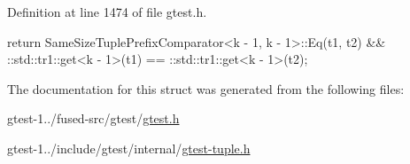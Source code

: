 \-Definition at line 1474 of file gtest.\-h.


\begin{DoxyCode}
                                                     {
    return SameSizeTuplePrefixComparator<k - 1, k - 1>::Eq(t1, t2) &&
        ::std::tr1::get<k - 1>(t1) == ::std::tr1::get<k - 1>(t2);
  }
\end{DoxyCode}


\-The documentation for this struct was generated from the following files\-:\begin{DoxyCompactItemize}
\item 
gtest-\/1../fused-\/src/gtest/\hyperlink{fused-src_2gtest_2gtest_8h}{gtest.\-h}\item 
gtest-\/1../include/gtest/internal/\hyperlink{gtest-tuple_8h}{gtest-\/tuple.\-h}\end{DoxyCompactItemize}
